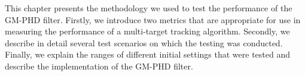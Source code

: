 This chapter presents the methodology we used to test the performance of the GM-PHD filter. Firstly, we introduce two metrics that are appropriate for use in measuring the performance of a multi-target tracking algorithm. Secondly, we describe in detail several test scenarios on which the testing was conducted. Finally, we explain the ranges of different initial settings that were tested and describe the implementation of the GM-PHD filter.
